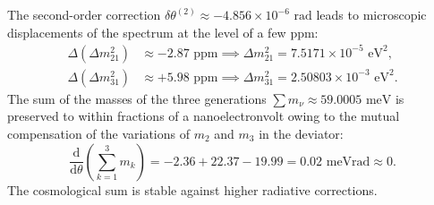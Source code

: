 \documentclass[11pt,a4paper]{article}
\theoremstyle{definition}
\theoremstyle{remark}
\begin{document}
The second-order correction $\delta\theta^{(2)} \approx -4.856 \times 10^{-6}\text{ rad}$ leads to microscopic displacements of the spectrum at the level of a few ppm:
\begin{align}
	\Delta(\Delta m_{21}^2) &\approx -2.87\text{ ppm} \implies \Delta m_{21}^2 = 7.5171 \times 10^{-5}\text{ eV}^2, \\
	\Delta(\Delta m_{31}^2) &\approx +5.98\text{ ppm} \implies \Delta m_{31}^2 = 2.50803 \times 10^{-3}\text{ eV}^2.
\end{align}
	The sum of the masses of the three generations $\sum m_\nu \approx 59.0005\text{ meV}$ is preserved to within fractions of a nanoelectronvolt owing to the mutual compensation of the variations of $m_2$ and $m_3$ in the deviator:
\begin{equation}
	\frac{\mathrm{d}}{\mathrm{d}\theta} \left(\sum_{k=1}^3 m_k\right) = -2.36 + 22.37 - 19.99 = 0.02\text{ meVrad} \approx 0.
	\label{eq:bps_cosmo_sum_stability}
\end{equation}
	The cosmological sum is stable against higher radiative corrections.
	
\end{document}
